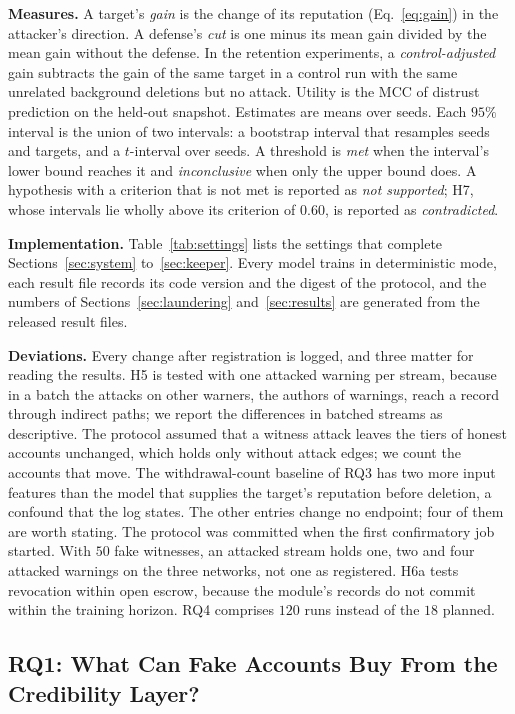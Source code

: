 \documentclass[lettersize,journal]{IEEEtran}
\begin{document}
\smallskip\noindent\textbf{Measures.}
A target's \emph{gain} is the change of its reputation (Eq.~\eqref{eq:gain}) in the attacker's direction.
A defense's \emph{cut} is one minus its mean gain divided by the mean gain without the defense.
In the retention experiments, a \emph{control-adjusted} gain subtracts the gain of the same target in a control run with the same unrelated background deletions but no attack.
Utility is the MCC of distrust prediction on the held-out snapshot.
Estimates are means over seeds. Each $95\%$ interval is the union of two intervals: a bootstrap interval that resamples seeds and targets, and a $t$-interval over seeds.
A threshold is \emph{met} when the interval's lower bound reaches it and \emph{inconclusive} when only the upper bound does. A hypothesis with a criterion that is not met is reported as \emph{not supported}; H7, whose intervals lie wholly above its criterion of $0.60$, is reported as \emph{contradicted}.

\smallskip\noindent\textbf{Implementation.}
Table~\ref{tab:settings} lists the settings that complete Sections~\ref{sec:system} to~\ref{sec:keeper}.
Every model trains in deterministic mode, each result file records its code version and the digest of the protocol, and the numbers of Sections~\ref{sec:laundering} and~\ref{sec:results} are generated from the released result files.

\smallskip\noindent\textbf{Deviations.}
Every change after registration is logged, and three matter for reading the results.
H5 is tested with one attacked warning per stream, because in a batch the attacks on other warners, the authors of warnings, reach a record through indirect paths; we report the differences in batched streams as descriptive.
The protocol assumed that a witness attack leaves the tiers of honest accounts unchanged, which holds only without attack edges; we count the accounts that move.
The withdrawal-count baseline of RQ3 has two more input features than the model that supplies the target's reputation before deletion, a confound that the log states.
The other entries change no endpoint; four of them are worth stating.
The protocol was committed when the first confirmatory job started.
With $50$ fake witnesses, an attacked stream holds one, two and four attacked warnings on the three networks, not one as registered.
H6a tests revocation within open escrow, because the module's records do not commit within the training horizon.
RQ4 comprises $120$ runs instead of the $18$ planned.

\subsection{RQ1: What Can Fake Accounts Buy From the Credibility Layer?}
\label{subsec:results_btp}
\end{document}
